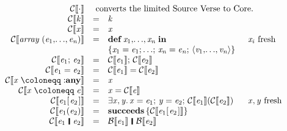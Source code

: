 \documentclass[acmsmall,screen]{acmart}\settopmatter{}
\newcommand{\Varid}[1]{\mathit{#1}}
\newcommand{\Cr}[1]{{\mathcal C}\llbracket #1 \rrbracket}
\newcommand{\Bi}[1]{{\mathcal B}\llbracket #1 \rrbracket}
\newenvironment{figurebox}{\begin{figure}\begin{framed}}{\end{framed}\end{figure}}
\begin{document}
\begin{figurebox}

$$
  \begin{array}{rcll}
    \ensuremath{\Cr{ \cdot }}   & \multicolumn{3}{l}{ \text{ converts the limited Source Verse to Core.} } \\
    \ensuremath{\Cr{ \Varid{k}}} & = & \ensuremath{\Varid{k}} \\
    \ensuremath{\Cr{ \Varid{x}}} & = & \ensuremath{\Varid{x}} \\
    \ensuremath{\Cr{ \Varid{array}\;(\Varid{e}_{\mathrm{1}},\!\ldots\!,\Varid{e}_{\Varid{n}})}} & = &
    \begin{array}[t]{@{}l}
    \ensuremath{\textbf{def}\;\Varid{x}_{\mathrm{1}},\!\ldots\!,\Varid{x}_{\Varid{n}}\;\textbf{in}\\\{\Varid{x}_{\mathrm{1}}\mathrel{=}\Varid{e}_{\mathrm{1}};\,\!\ldots\!;\,\Varid{x}_{\Varid{n}}\mathrel{=}\Varid{e}_{\Varid{n}};\,\langle\Varid{v}_{\mathrm{1}},\!\ldots\!,\Varid{v}_{\Varid{n}}\rangle\}} \\
    \end{array}
	& \text{\ensuremath{\Varid{x}_{\Varid{i}}} fresh} \\
    \ensuremath{\Cr{ \Varid{e}_{\mathrm{1}};\,\Varid{e}_{\mathrm{2}}}} & = & \ensuremath{\Cr{ \Varid{e}_{\mathrm{1}}};\,\Cr{ \Varid{e}_{\mathrm{2}}}} \\
    \ensuremath{\Cr{ \Varid{e}_{\mathrm{1}}\mathrel{=}\Varid{e}_{\mathrm{2}}}} & = & \ensuremath{\Cr{ \Varid{e}_{\mathrm{1}}}\mathrel{=}\Cr{ \Varid{e}_{\mathrm{2}}}} \\
    \ensuremath{\Cr{ \Varid{x}\mathrel{\coloneqq}\mathbin{:}\textbf{any}}} & = & \ensuremath{\Varid{x}} \\
    \ensuremath{\Cr{ \Varid{x}\mathrel{\coloneqq}\Varid{e}}} & = & \ensuremath{\Varid{x}\mathrel{=}\Cr{ \Varid{e}}} \\
    \ensuremath{\Cr{ \Varid{e}_{\mathrm{1}} [\mskip1.5mu \Varid{e}_{\mathrm{2}}\mskip1.5mu]}} & = & \ensuremath{\exists\Varid{x},\Varid{y}.\,\Varid{x}\mathrel{=}\Varid{e}_{\mathrm{1}};\,\Varid{y}\mathrel{=}\Varid{e}_{\mathrm{2}};\,\Cr{ \Varid{e}_{\mathrm{1}}}(\Cr{ \Varid{e}_{\mathrm{2}}})} & \text{\ensuremath{\Varid{x},\Varid{y}} fresh} \\
    \ensuremath{\Cr{ \Varid{e}_{\mathrm{1}} (\Varid{e}_{\mathrm{2}})}} & = & \ensuremath{\textbf{succeeds}\,\{\Cr{ \Varid{e}_{\mathrm{1}} [\mskip1.5mu \Varid{e}_{\mathrm{2}}\mskip1.5mu]}\}} \\
    \ensuremath{\Cr{ \Varid{e}_{\mathrm{1}}\hspace{0.2em}\mathop{\rule[-0.1em]{0.15em}{0.75em}}\hspace{0.2em}\Varid{e}_{\mathrm{2}}}} & = & \ensuremath{\Bi{ \Varid{e}_{\mathrm{1}}}\hspace{0.2em}\mathop{\rule[-0.1em]{0.15em}{0.75em}}\hspace{0.2em}\Bi{ \Varid{e}_{\mathrm{2}}}} \\

\end{array}$$
\end{figurebox}
\end{document}
